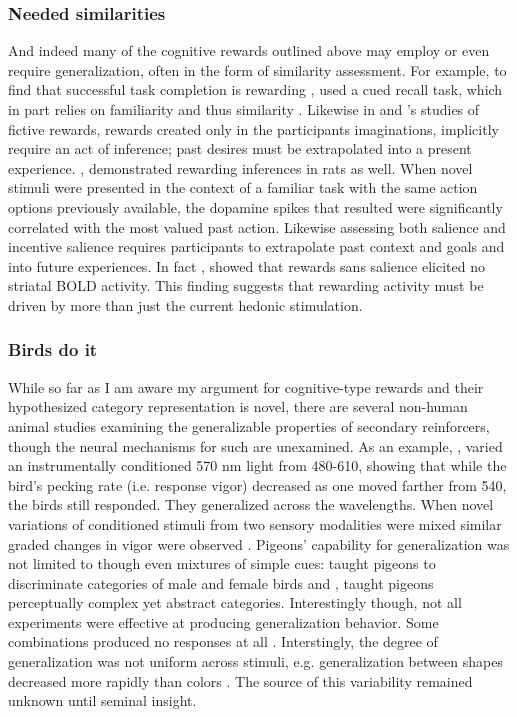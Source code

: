 \documentclass[doc,12pt]{apa}        %
\begin{document}
\subsubsection{Needed similarities}
\label{subsub:needed}
And indeed many of the cognitive rewards outlined above may employ or even require generalization, often in the form of similarity assessment.  For example, to find that successful task completion is rewarding , used a cued recall task, which in part relies on familiarity \cite{Jacoby:1991p9096} and thus similarity \cite{Nosofsky:1988p9098}.  Likewise in  and 's studies of fictive rewards, rewards created only in the participants imaginations, implicitly require an act of inference; past desires must be extrapolated into a present experience.  , demonstrated rewarding inferences in rats as well.  When novel stimuli were presented in the context of a familiar task with the same action options previously available, the dopamine spikes that resulted were significantly correlated with the most valued past action.  Likewise assessing both salience and incentive salience requires participants to extrapolate past context and goals and into future experiences.  In fact , showed that rewards sans salience elicited no striatal BOLD activity.  This finding suggests that rewarding activity must be driven by more than just the current hedonic stimulation.

\subsubsection{Birds do it}
\label{subsub:birds}
While so far as I am aware my argument for cognitive-type rewards and their hypothesized category representation is novel, there are several non-human animal studies examining the generalizable properties of secondary reinforcers, though the neural mechanisms for such are unexamined.  As an example, , varied an instrumentally conditioned 570 nm light from 480-610, showing that while the bird's pecking rate (i.e. response vigor) decreased as one moved farther from 540, the birds still responded.  They generalized across the wavelengths.  When novel variations of conditioned stimuli from two sensory modalities were mixed similar graded changes in vigor were observed  \cite{Guttman:1956p8355}.  Pigeons' capability for generalization was not limited to though even mixtures of simple cues: \cite{Nakamura:2006p9093} taught pigeons to discriminate categories of male and female birds and , taught pigeons perceptually complex yet abstract categories.  Interestingly though, not all experiments were effective at producing generalization behavior.  Some combinations produced no responses at all \cite{Blough:2001p8408,Simmons:2008p8405,Urcuioli:2001p8359}.  Interstingly, the degree of generalization was not uniform across stimuli, e.g. generalization between shapes decreased more rapidly than colors .  The source of this variability remained unknown until  seminal insight.
\end{document}
